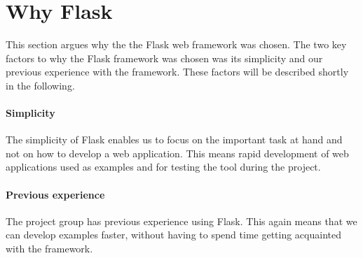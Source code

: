 \section{Why Flask}
This section argues why the the Flask web framework was chosen.
The two key factors to why the Flask framework was chosen was its simplicity and our previous experience with the framework.
These factors will be described shortly in the following.

\paragraph{Simplicity}
The simplicity of Flask enables us to focus on the important task at hand and not on how to develop a web application.
This means rapid development of web applications used as examples and for testing the tool during the project.

\paragraph{Previous experience}
The project group has previous experience using Flask.
This again means that we can develop examples faster, without having to spend time getting acquainted with the framework.

